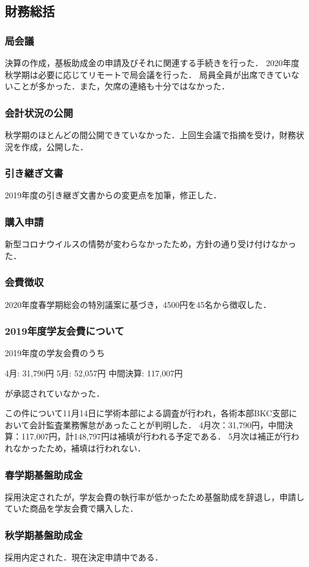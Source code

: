 \subsection*{財務総括}


\subsubsection*{局会議}
決算の作成，基板助成金の申請及びそれに関連する手続きを行った．
2020年度秋学期は必要に応じてリモートで局会議を行った．
局員全員が出席できていないことが多かった．また，欠席の連絡も十分ではなかった．


\subsubsection*{会計状況の公開}
秋学期のほとんどの間公開できていなかった．上回生会議で指摘を受け，財務状況を作成，公開した．


\subsubsection*{引き継ぎ文書}
2019年度の引き継ぎ文書からの変更点を加筆，修正した．


\subsubsection*{購入申請}
新型コロナウイルスの情勢が変わらなかったため，方針の通り受け付けなかった．


\subsubsection*{会費徴収}
2020年度春学期総会の特別議案に基づき，4500円を45名から徴収した．


\subsubsection*{2019年度学友会費について}
2019年度の学友会費のうち
\begin{itemize}
	\itemize[-] 4月: 31,790円
	\itemize[-] 5月: 52,057円
	\itemize[-] 中間決算: 117,007円
\end{itemize} 
が承認されていなかった．

この件について11月14日に学術本部による調査が行われ，各術本部BKC支部において会計監査業務懈怠があったことが判明した．
4月次：31,790円，中間決算：117,007円，計148,797円は補填が行われる予定である．
5月次は補正が行われなかったため，補填は行われない．


\subsubsection*{春学期基盤助成金}
採用決定されたが，学友会費の執行率が低かったため基盤助成を辞退し，申請していた商品を学友会費で購入した．


\subsubsection*{秋学期基盤助成金}
採用内定された．現在決定申請中である．
